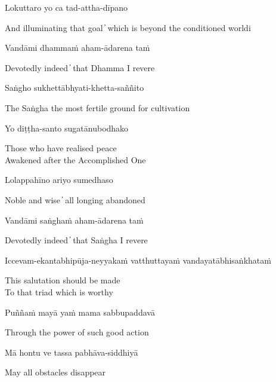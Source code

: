 Lokuttaro yo ca tad-attha-dīpano

\begin{cprenglish}
  And illuminating that goal  ̓  which is beyond the conditioned worldi
\end{cprenglish}

Vandāmi dhammaṁ aham-ādarena taṁ

\begin{cprenglish}
  Devotedly indeed  ̓  that Dhamma I revere
\end{cprenglish}

Saṅgho sukhettābhyati-khetta-saññito

\begin{cprenglish}
  The Saṅgha the most fertile ground for cultivation
\end{cprenglish}

Yo diṭṭha-santo sugatānubodhako

\begin{cprenglish}
  Those who have realised peace\\
  Awakened after the Accomplished One
\end{cprenglish}

Lolappahīno ariyo sumedhaso

\begin{cprenglish}
  Noble and wise  ̓  all longing abandoned
\end{cprenglish}

Vandāmi saṅghaṁ aham-ādarena taṁ

\begin{cprenglish}
  Devotedly indeed  ̓  that Saṅgha I revere
\end{cprenglish}

Iccevam-ekantabhipūja-neyyakaṁ vatthuttayaṁ vandayatābhisaṅkhataṁ

\begin{cprenglish}
  This salutation should be made\\
  To that triad which is worthy
\end{cprenglish}

Puññaṁ mayā yaṁ mama sabbupaddavā

\begin{cprenglish}
  Through the power of such good action
\end{cprenglish}

Mā hontu ve tassa pabhāva-siddhiyā

\begin{cprenglish}
  May all obstacles disappear
\end{cprenglish}


